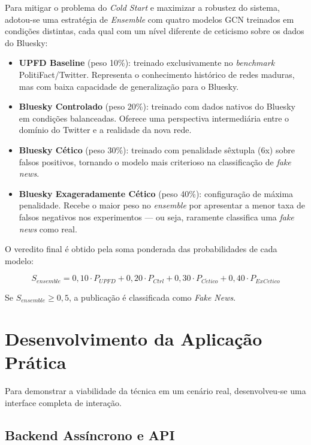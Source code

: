 Para mitigar o problema do \textit{Cold Start} e maximizar a robustez do sistema, adotou-se uma estratégia de \textit{Ensemble} com quatro modelos GCN treinados em condições distintas, cada qual com um nível diferente de ceticismo sobre os dados do Bluesky:

\begin{itemize}
    \item \textbf{UPFD Baseline} (peso 10\%): treinado exclusivamente no \textit{benchmark} PolitiFact/Twitter. Representa o conhecimento histórico de redes maduras, mas com baixa capacidade de generalização para o Bluesky.
    \item \textbf{Bluesky Controlado} (peso 20\%): treinado com dados nativos do Bluesky em condições balanceadas. Oferece uma perspectiva intermediária entre o domínio do Twitter e a realidade da nova rede.
    \item \textbf{Bluesky Cético} (peso 30\%): treinado com penalidade sêxtupla (6x) sobre falsos positivos, tornando o modelo mais criterioso na classificação de \textit{fake news}.
    \item \textbf{Bluesky Exageradamente Cético} (peso 40\%): configuração de máxima penalidade. Recebe o maior peso no \textit{ensemble} por apresentar a menor taxa de falsos negativos nos experimentos --- ou seja, raramente classifica uma \textit{fake news} como real.
\end{itemize}

O veredito final é obtido pela soma ponderada das probabilidades de cada modelo:

\begin{equation}
S_{ensemble} = 0{,}10 \cdot P_{UPFD} + 0{,}20 \cdot P_{Ctrl} + 0{,}30 \cdot P_{C\acute{e}tico} + 0{,}40 \cdot P_{ExCetico}
\end{equation}

Se $S_{ensemble} \geq 0{,}5$, a publicação é classificada como \textit{Fake News}.

\section{Desenvolvimento da Aplicação Prática}

Para demonstrar a viabilidade da técnica em um cenário real, desenvolveu-se uma interface completa de interação.

\subsection{Backend Assíncrono e API}

